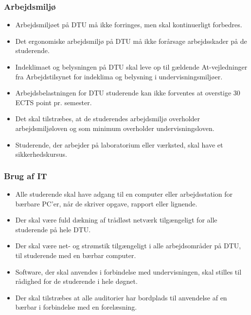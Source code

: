 \subsubsection{Arbejdsmiljø}
\begin{itemize}
\item Arbejdsmiljøet på DTU må ikke forringes, men skal kontinuerligt forbedres.
\item Det ergonomiske arbejdsmiljø på DTU må ikke forårsage arbejdsskader på de studerende.
\item Indeklimaet og belysningen på DTU skal leve op til gældende At-vejledninger fra Arbejdstilsynet for indeklima og belysning i undervisningsmiljøer.
\item Arbejdsbelastningen for DTU studerende kan ikke forventes at overstige 30 ECTS point pr. semester.
\item Det skal tilstræbes, at de studerendes arbejdsmiljø overholder arbejdsmiljøloven og som minimum overholder undervisningsloven.
\item Studerende, der arbejder på laboratorium eller værksted, skal have et sikkerhedskursus.
\end{itemize}

\subsubsection{Brug af IT}
\begin{itemize}
\item Alle studerende skal have adgang til en computer eller arbejdsstation for bærbare PC’er, når de skriver opgave, rapport eller lignende.
\item Der skal være fuld dækning af trådløst netværk tilgængeligt for alle studerende på hele DTU.
\item Der skal være net- og strømstik tilgængeligt i alle arbejdsområder på DTU, til studerende med en bærbar computer.
\item Software, der skal anvendes i forbindelse med undervisningen, skal stilles til rådighed for de studerende i hele døgnet.
\item Der skal tilstræbes at alle auditorier har bordplads til anvendelse af en bærbar i forbindelse med en forelæsning.
\end{itemize}

